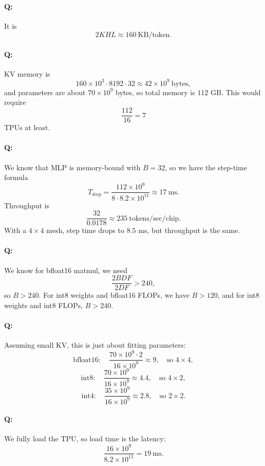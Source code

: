 \documentclass[11pt]{article}
\newcommand{\B}{B}
\newcommand{\bytes}{\mathrm{bytes}}
\newcommand{\ms}{\mathrm{ms}}
\newcommand{\quizbreak}{\Needspace{6\baselineskip}}
\begin{document}
\clearpage
\section{}

\quizbreak
\paragraph{Q:}
It is
\[
  2KHL\approx 160\ \mathrm{KB/token}.
\]

\quizbreak
\paragraph{Q:}
KV memory is
\[
  160\times 10^3\cdot 8192\cdot 32
  \approx 42\times 10^9\ \bytes,
\]
and parameters are about $70\times 10^9$ bytes, so total memory is $112$ GB. This would require
\[
  \frac{112}{16}=7
\]
TPUs at least.

\quizbreak
\paragraph{Q:}
We know that MLP is memory-bound with $\B=32$, so we have the step-time formula
\[
  T_{\mathrm{step}}
  =
  \frac{112\times 10^9}{8\cdot 8.2\times 10^{11}}
  \approx 17\ \ms.
\]
Throughput is
\[
  \frac{32}{0.0178}
  \approx 235\ \mathrm{tokens/sec/chip}.
\]
With a $4\times 4$ mesh, step time drops to $8.5$ ms, but throughput is the same.

\quizbreak
\paragraph{Q:}
We know for bfloat16 matmul, we need
\[
  \frac{2BDF}{2DF}>240,
\]
so $\B>240$. For int8 weights and bfloat16 FLOPs, we have $\B>120$, and for int8 weights and int8 FLOPs, $\B>240$.

\quizbreak
\paragraph{Q:}
Assuming small KV, this is just about fitting parameters:
\[
  \mathrm{bfloat16:}\quad
  \frac{70\times 10^9\cdot 2}{16\times 10^9}
  \approx 9,
  \quad\text{so }4\times 4,
\]
\[
  \mathrm{int8:}\quad
  \frac{70\times 10^9}{16\times 10^9}
  \approx 4.4,
  \quad\text{so }4\times 2,
\]
\[
  \mathrm{int4:}\quad
  \frac{35\times 10^9}{16\times 10^9}
  \approx 2.8,
  \quad\text{so }2\times 2.
\]

\quizbreak
\paragraph{Q:}
We fully load the TPU, so load time is the latency:
\[
  \frac{16\times 10^9}{8.2\times 10^{11}}
  =
  19\ \ms.
\]
\end{document}
